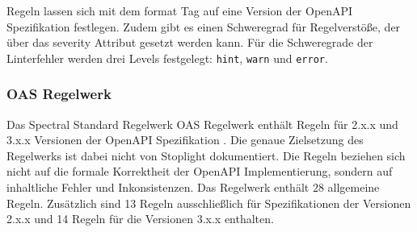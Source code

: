 Regeln lassen sich mit dem format Tag auf eine Version der OpenAPI Spezifikation festlegen. Zudem gibt es einen Schweregrad für Regelverstöße, der über das severity Attribut gesetzt werden kann. Für die Schweregrade der Linterfehler werden drei Levels festgelegt: \texttt{hint}, \texttt{warn} und \texttt{error}.

\subsubsection{OAS Regelwerk} \label{sec:oasregelwerk}

Das Spectral Standard Regelwerk OAS Regelwerk enthält Regeln für 2.x.x und 3.x.x Versionen der OpenAPI Spezifikation \parencite{stoplight_spectral_2024}. Die genaue Zielsetzung des Regelwerks ist dabei nicht von Stoplight dokumentiert. Die Regeln beziehen sich nicht auf die formale Korrektheit der OpenAPI Implementierung, sondern auf inhaltliche Fehler und Inkonsistenzen. Das Regelwerk enthält 28 allgemeine Regeln. Zusätzlich sind 13 Regeln ausschließlich für Spezifikationen der Versionen 2.x.x und 14 Regeln für die Versionen 3.x.x enthalten.

